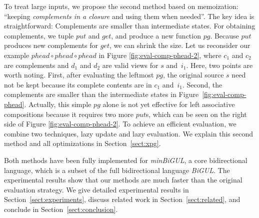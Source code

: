 To treat large inputs, we propose the second method based on memoization: ``keeping \emph{complements in a closure} and using them when needed''. The key idea is straightforward: Complements are smaller
than
intermediate states.
%
%
For obtaining complements, we tuple $put$ and $get$, and produce a new function $pg$. Because $put$ produces new complements for $get$, we can shrink the size.
Let us reconsider our example $phead \circ phead \circ phead$ in Figure \ref{fig:eval-comp-phead-2}, where $c_1$ and $c_2$ are complements and $d_1$ and $d_2$ are valid views for $s$ and~$i_1$. Here, two points are worth noting. First, after evaluating the leftmost $pg$, the original source $s$ need not be kept because its complete contents are in $c_1$ and~$i_1$. Second, the complements are smaller than the intermediate states in Figure~\ref{fig:eval-comp-phead}.
Actually, this simple
$pg$ alone is not yet effective for left associative compositions because it requires two more $put$s, which can be seen on the right side of Figure \ref{fig:eval-comp-phead-2}. To achieve an efficient evaluation, we combine two techniques, lazy update and lazy evaluation. We explain this second method and all optimizations in Section~\ref{sect:xpg}.

Both methods have been fully implemented for \emph{minBiGUL}, a core bidirectional language, which is a subset of the full bidirectional language \emph{BiGUL}. The experimental results show that our methods are much faster than the original evaluation strategy.
We give detailed experimental results in Section~\ref{sect:experiments}, discuss related work in Section~\ref{sect:related}, and conclude in Section~\ref{sect:conclusion}.



